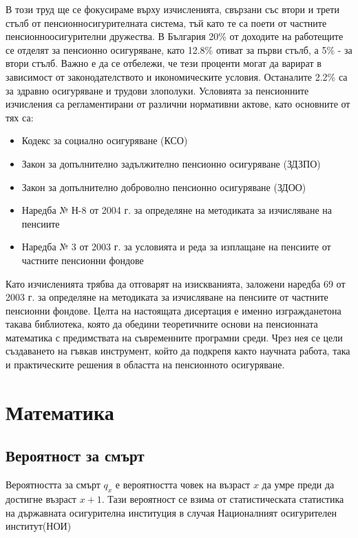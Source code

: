 \documentclass[a4paper,12pt]{article}
\begin{document}
В този труд ще се фокусираме върху изчисленията, свързани със втори и трети стълб от пенсионносигурителната система, тъй като те са поети от частните пенсионноосигурителни дружества. В България 20\% от доходите на работещите се отделят за пенсионно осигуряване, като 12.8\% отиват за първи стълб, а 5\% - за втори стълб. Важно е да се отбележи, че тези проценти могат да варират в зависимост от законодателството и икономическите условия. Останалите 2.2\% са за здравно осигуряване и трудови злополуки.\cite{ZDZPO_2004, ZDOO_2000}
\newline
\newline
Условията за пенсионните изчисления са регламентирани от различни нормативни актове, като основните от тях са:
\begin{itemize}
        \item Кодекс за социално осигуряване (КСО)
        \item Закон за допълнително задължително пенсионно осигуряване (ЗДЗПО)
        \item Закон за допълнително доброволно пенсионно осигуряване (ЗДОО)
        \item Наредба № Н-8 от 2004 г. за определяне на методиката за изчисляване на пенсиите
        \item Наредба № 3 от 2003 г. за условията и реда за изплащане на пенсиите от частните пенсионни фондове
\end{itemize}
Като изчисленията трябва да отговарят на изискванията, заложени наредба 69 от 2003 г. за определяне на методиката за изчисляване на пенсиите от частните пенсионни фондове. \cite{ZDZPO_2004, ZDOO_2000, DKFN_Pensions, NOI_Official}
\newline
\newline
Целта на настоящата дисертация е именно изгражданетона такава библиотека, която да обедини теоретичните основи на пенсионната математика с предимствата на съвременните програмни среди. Чрез нея се цели създаването на гъвкав инструмент, който да подкрепя както научната работа, така и практическите решения в областта на пенсионното осигуряване.
\newpage
\section{Математика}
\subsection{Вероятност за смърт}
Вероятността за смърт $q_x$ е вероятността човек на възраст $x$ да умре преди да достигне възраст $x+1$. Тази вероятност се взима от статистическата статистика на държавната осигурителна институция  в случая Националният осигурителен институт(НОИ)
\end{document}
